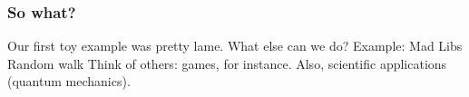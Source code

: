 \documentclass[11pt]{beamer}
\begin{document}
\begin{frame}[fragile]
  \frametitle{So what?}
  \Enlarge

  \begin{enumerate}
  \myitem  Our first toy example was pretty lame.  What else can we do?
  \myitem    Example:  Mad Libs
  \myitem    Random walk
  \myitem    Think of others:  games, for instance.
  \myitem    Also, scientific applications (quantum mechanics).
  \end{enumerate}
\end{frame}
\end{document}
